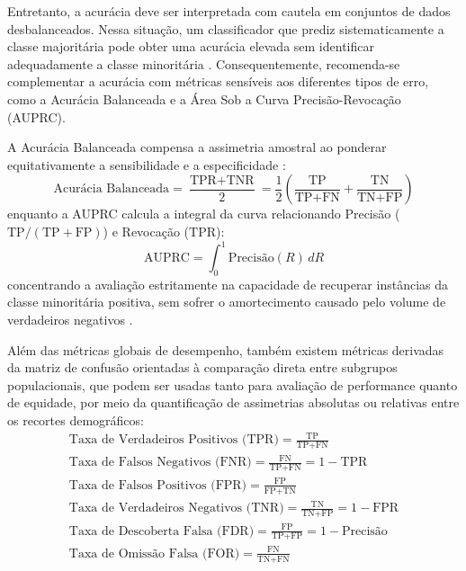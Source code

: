 Entretanto, a acurácia deve ser interpretada com cautela em conjuntos de dados desbalanceados. Nessa situação, um classificador que prediz sistematicamente a classe majoritária pode obter uma acurácia elevada sem identificar adequadamente a classe minoritária \cite{he2009learning}. Consequentemente, recomenda-se complementar a acurácia com métricas sensíveis aos diferentes tipos de erro, como a Acurácia Balanceada e a Área Sob a Curva Precisão-Revocação (AUPRC).

A Acurácia Balanceada compensa a assimetria amostral ao ponderar equitativamente a sensibilidade e a especificidade \cite{brodersen2010balanced}:
\begin{equation}
\text{Acurácia Balanceada} = \frac{\text{TPR} + \text{TNR}}{2} = \frac{1}{2} \left( \frac{\text{TP}}{\text{TP} + \text{FN}} + \frac{\text{TN}}{\text{TN} + \text{FP}} \right)
\end{equation}
enquanto a AUPRC calcula a integral da curva relacionando Precisão ($\text{TP} / (\text{TP} + \text{FP})$) e Revocação ($\text{TPR}$)\cite{davis2006relationship}:
\begin{equation}
\text{AUPRC} = \int_{0}^{1} \text{Precisão}(R) \, dR
\end{equation}
concentrando a avaliação estritamente na capacidade de recuperar instâncias da classe minoritária positiva, sem sofrer o amortecimento causado pelo volume de verdadeiros negativos \cite{saito2015precision}.

Além das métricas globais de desempenho, também existem métricas derivadas da matriz de confusão orientadas à comparação direta entre subgrupos populacionais, que podem ser usadas tanto para avaliação de performance quanto de equidade, por meio da quantificação de assimetrias absolutas ou relativas entre os recortes demográficos:
\begin{gather}
\text{Taxa de Verdadeiros Positivos (TPR)} = \frac{\text{TP}}{\text{TP} + \text{FN}} \\[8pt]
\text{Taxa de Falsos Negativos (FNR)} = \frac{\text{FN}}{\text{TP} + \text{FN}} = 1 - \text{TPR} \\[8pt]
\text{Taxa de Falsos Positivos (FPR)} = \frac{\text{FP}}{\text{FP} + \text{TN}} \\[8pt]
\text{Taxa de Verdadeiros Negativos (TNR)} = \frac{\text{TN}}{\text{TN} + \text{FP}} = 1 - \text{FPR} \\[8pt]
\text{Taxa de Descoberta Falsa (FDR)} = \frac{\text{FP}}{\text{TP} + \text{FP}} = 1 - \text{Precisão} \\[8pt]
\text{Taxa de Omissão Falsa (FOR)} = \frac{\text{FN}}{\text{TN} + \text{FN}}
\end{gather}

